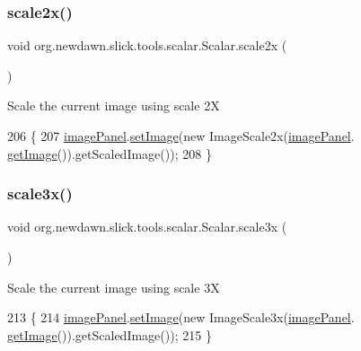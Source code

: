\subsubsection{\texorpdfstring{scale2x()}{scale2x()}}
{\footnotesize\ttfamily void org.\+newdawn.\+slick.\+tools.\+scalar.\+Scalar.\+scale2x (\begin{DoxyParamCaption}{ }\end{DoxyParamCaption})\hspace{0.3cm}{\ttfamily [inline]}}

Scale the current image using scale 2X 
\begin{DoxyCode}
206                           \{
207         \mbox{\hyperlink{classorg_1_1newdawn_1_1slick_1_1tools_1_1scalar_1_1_scalar_a660c23cbae7b52f06768db8e8841bc39}{imagePanel}}.\mbox{\hyperlink{classorg_1_1newdawn_1_1slick_1_1tools_1_1scalar_1_1_image_panel_a16339485944d8c28fc4c198f5fc21705}{setImage}}(\textcolor{keyword}{new} ImageScale2x(\mbox{\hyperlink{classorg_1_1newdawn_1_1slick_1_1tools_1_1scalar_1_1_scalar_a660c23cbae7b52f06768db8e8841bc39}{imagePanel}}.
      \mbox{\hyperlink{classorg_1_1newdawn_1_1slick_1_1tools_1_1scalar_1_1_image_panel_af4f896a1413288f465a7651d4c562c3c}{getImage}}()).getScaledImage());
208     \}
\end{DoxyCode}
\mbox{\label{classorg_1_1newdawn_1_1slick_1_1tools_1_1scalar_1_1_scalar_a708bacdbf38e24c992ca8d919b2c8aed}} 
\subsubsection{\texorpdfstring{scale3x()}{scale3x()}}
{\footnotesize\ttfamily void org.\+newdawn.\+slick.\+tools.\+scalar.\+Scalar.\+scale3x (\begin{DoxyParamCaption}{ }\end{DoxyParamCaption})\hspace{0.3cm}{\ttfamily [inline]}}

Scale the current image using scale 3X 
\begin{DoxyCode}
213                           \{
214         \mbox{\hyperlink{classorg_1_1newdawn_1_1slick_1_1tools_1_1scalar_1_1_scalar_a660c23cbae7b52f06768db8e8841bc39}{imagePanel}}.\mbox{\hyperlink{classorg_1_1newdawn_1_1slick_1_1tools_1_1scalar_1_1_image_panel_a16339485944d8c28fc4c198f5fc21705}{setImage}}(\textcolor{keyword}{new} ImageScale3x(\mbox{\hyperlink{classorg_1_1newdawn_1_1slick_1_1tools_1_1scalar_1_1_scalar_a660c23cbae7b52f06768db8e8841bc39}{imagePanel}}.
      \mbox{\hyperlink{classorg_1_1newdawn_1_1slick_1_1tools_1_1scalar_1_1_image_panel_af4f896a1413288f465a7651d4c562c3c}{getImage}}()).getScaledImage());
215     \}
\end{DoxyCode}


